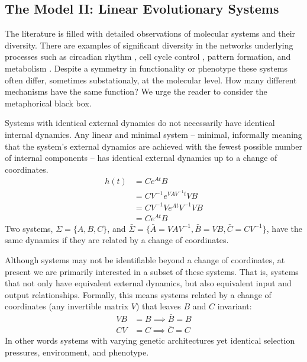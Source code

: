 \documentclass[9 pt]{article}
\newcommand{\1}{\mathbbm{1}}
\begin{document}
\begin{multicols}{2}
  \section*{The Model II: Linear Evolutionary Systems}

  The literature is filled with detailed observations of molecular systems and their diversity. There are examples of significant diversity in the networks underlying processes such as circadian rhythm \citep{sancar2008intelligent}, cell cycle control \citep{cross2011evolution, kearsey2003enigmatic}, pattern formation, and metabolism  \citep{lavoie2009rearrangements, martchenko2007transcriptional, dalal2016transcriptional, christensen2011unique, hartl2007induction, alam2013aspergillus}. Despite a symmetry in functionality or phenotype these systems often differ, sometimes substationaly, at the molecular level. How many different mechanisms have the same function? We urge the reader to consider the metaphorical black box.

  Systems with identical external dynamics do not necessarily have identical internal dynamics. Any linear and minimal system -- minimal, informally meaning that the system's external dynamics are achieved with the fewest possible number of internal components -- has identical external dynamics up to a change of coordinates. 
  \begin{align}
    h(t) &= C e^{A t} B \\
    &= C V^{-1} e^{V A V^{-1} t} V B \\
    &= C V^{-1} V e^{A t} V^{-1} V B \\
    &= C e^{A t} B
  \end{align}
  Two systems, $\Sigma = \{ A, B, C \}$, and $\bar{\Sigma} = \{\bar{A} = VAV^{-1}, \bar{B} = VB, \bar{C} = CV^{-1} \}$, have the same dynamics if they are related by a change of coordinates. 

  Although systems may not be identifiable beyond a change of coordinates, at present we are primarily interested in a subset of these systems. That is, systems that not only have equivalent external dynamics, but also equivalent input and output relationships. Formally, this means systems related by a change of coordinates (any invertible matrix $V$) that leaves $B$ and $C$ invariant:
  \begin{align}
    VB &= B \implies \bar{B} = B \\
    CV &= C \implies \bar{C} = C
  \end{align}
  In other words systems with varying genetic architectures yet identical selection pressures, environment, and phenotype. 


\end{multicols}
\end{document}
